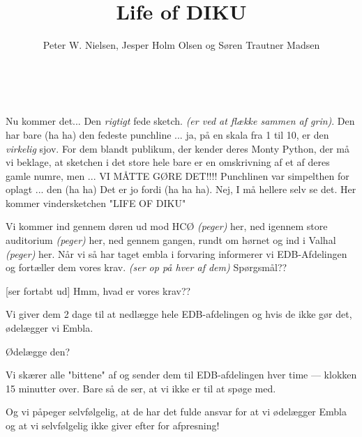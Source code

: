 \documentclass[10pt]{article}
\title{Life of DIKU}
\author{Peter W. Nielsen, Jesper Holm Olsen og Søren Trautner Madsen}
\begin{document}
\maketitle

\begin{sketch}

\begin{roles}
  ~
  ~
\end{roles}



 Nu kommer det... Den {\em rigtigt} fede sketch. {\em (er ved at flække
sammen af grin)}. Den har bare (ha ha) den fedeste punchline ... ja, på en skala fra 1 til
10, er den {\em virkelig} sjov. For dem blandt publikum, der kender deres Monty Python,
der må vi beklage, at sketchen i det store hele bare er en omskrivning af et af deres
gamle numre, men ... VI MÅTTE GØRE DET!!!! Punchlinen var simpelthen for oplagt ... den
(ha ha) Det er jo fordi (ha ha ha). Nej, I må hellere selv se det. Her kommer
vindersketchen "LIFE OF DIKU"



 Vi kommer ind gennem døren ud mod HCØ {\em (peger)} her, ned
igennem store auditorium {\em (peger)} her, ned gennem gangen, rundt om
hørnet og ind i Valhal {\em (peger)} her. Når vi så har taget {\sc embla} i
forvaring informerer vi EDB-Afdelingen og fortæller dem vores krav. {\em
  (ser op på hver af dem)} Spørgsmål??

 [ser fortabt ud] Hmm, hvad er vores krav??

 Vi giver dem 2 dage til at nedlægge hele EDB-afdelingen og hvis de ikke 
gør det, ødelægger vi Embla.

 Ødelægge den?

 Vi skærer alle "bittene" af og sender dem til EDB-afdelingen hver time ---
klokken 15 minutter over. Bare så de ser, at vi ikke er til at spøge med.

 Og vi påpeger selvfølgelig, at de har det fulde ansvar for at vi ødelægger
 Embla og at vi selvfølgelig ikke giver efter for afpresning!


\end{sketch}
\end{document}
